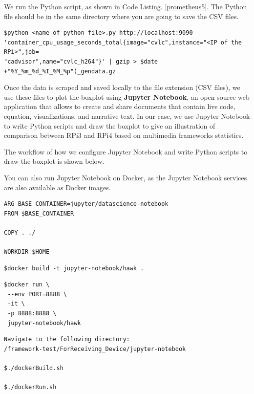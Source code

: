 We run the Python script, as shown in Code Listing. \ref{prometheus5}. The Python file should be in the same directory where you are going to save the CSV files.

\begin{lstlisting}[caption={Run Python script}, frame=single, label={prometheus5}]
$python <name of python file>.py http://localhost:9090 
'container_cpu_usage_seconds_total{image="cvlc",instance="<IP of the RPi>",job=
"cadvisor",name="cvlc_h264"}' | gzip > $date +"%Y_%m_%d_%I_%M_%p")_gendata.gz
\end{lstlisting}

Once the data is scraped and saved locally to the file extension (CSV files), we use these files to plot the boxplot using \textbf{Jupyter Notebook}, an open-source web application that allows to create and share documents that contain live code, equation, visualizations, and narrative text. In our case, we use Jupyter Notebook to write Python scripts and draw the boxplot to give an illustration of comparison between RPi3 and RPi4 based on multimedia frameworks statistics. \par

The workflow of how we configure Jupyter Notebook and write Python scripts to draw the boxplot is shown below. \par

You can also run Jupyter Notebook on Docker, as the Jupyter Notebook services are also available as Docker images. 

\begin{lstlisting}[caption={Dockerfile for Jupyter Notebook}, frame=single, label={jp1}]
ARG BASE_CONTAINER=jupyter/datascience-notebook
FROM $BASE_CONTAINER
	
COPY . ./

WORKDIR $HOME
\end{lstlisting}

\begin{lstlisting}[caption={dockerBuild.sh}, frame=single, label={jp2}]
$docker build -t jupyter-notebook/hawk .
\end{lstlisting}

\begin{lstlisting}[caption={dockerRun.sh}, frame=single, label={jp3}]
$docker run \
 --env PORT=8888 \
 -it \
 -p 8888:8888 \
 jupyter-notebook/hawk
\end{lstlisting}

\begin{lstlisting}[caption={Build and run Jupyter Notebook on Docker}, frame=single, label={jp4}]
Navigate to the following directory:
/framework-test/ForReceiving_Device/jupyter-notebook
	
$./dockerBuild.sh
	
$./dockerRun.sh
\end{lstlisting}

